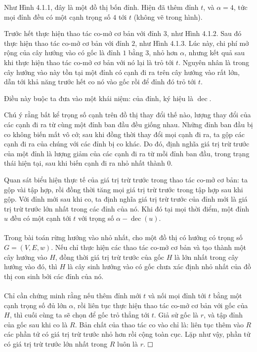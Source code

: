 \documentclass[11pt]{article}
\newcommand{\proofbox}{\ensuremath{\vcenter{\hrule height 0.45pt
  \hbox{\vrule width 0.45pt height 6pt\kern 6pt\vrule width 0.45pt}
  \hrule height 0.45pt}}}
\begin{document}
Như Hình 4.1.1, đây là một đồ thị bốn đỉnh. Hiện đã thêm đỉnh \(t\), và
\(\alpha=4\), tức mọi đỉnh đều có một cạnh trọng số \(4\) tới \(t\) (không vẽ
trong hình).

Trước hết thực hiện thao tác co-mở cơ bản với đỉnh \(3\), như Hình 4.1.2. Sau
đó thực hiện thao tác co-mở cơ bản với đỉnh \(2\), như Hình 4.1.3. Lúc này,
chi phí mở rộng của cây hướng vào có gốc là đỉnh \(1\) bằng \(3\), nhỏ hơn
\(\alpha\), nhưng kết quả sau khi thực hiện thao tác co-mở cơ bản với nó lại
là trỏ tới \(t\). Nguyên nhân là trong cây hướng vào này tồn tại một đỉnh có
cạnh đi ra trên cây hướng vào rất lớn, dẫn tới khả năng trước hết co nó vào gốc
rồi để đỉnh đó trỏ tới \(t\).

Điều này buộc ta đưa vào một khái niệm:  của đỉnh, ký
hiệu là \(\operatorname{dec}\).

Chú ý rằng bất kể trọng số cạnh trên đồ thị thay đổi thế nào, lượng thay đổi
của các cạnh đi ra từ cùng một đỉnh ban đầu đều giống nhau. Những đỉnh ban đầu
bị co không biến mất vô cớ; sau khi đồng thời thay đổi mọi cạnh đi ra, ta gộp
các cạnh đi ra của chúng với các đỉnh bị co khác. Do đó, định nghĩa giá trị trừ
trước của một đỉnh là lượng giảm của các cạnh đi ra từ mỗi đỉnh ban đầu, trong
trạng thái hiện tại, sau khi biến cạnh đi ra nhỏ nhất thành \(0\).

Quan sát biểu hiện thực tế của giá trị trừ trước trong thao tác co-mở cơ bản:
ta gộp vài tập hợp, rồi đồng thời tăng mọi giá trị trừ trước trong tập hợp sau
khi gộp. Với đỉnh mới sau khi co, ta định nghĩa giá trị trừ trước của đỉnh mới
là giá trị trừ trước lớn nhất trong các đỉnh của nó. Khi đó tại mọi thời điểm,
một đỉnh \(u\) đều có một cạnh tới \(t\) với trọng số
\(\alpha-\operatorname{dec}(u)\).

\paragraph{}
Trong bài toán rừng hướng vào nhỏ nhất, cho một đồ thị có hướng có trọng số
\(G=(V,E,w)\). Nếu chỉ thực hiện các thao tác co-mở cơ bản và tạo thành một cây
hướng vào \(H\), đồng thời giá trị trừ trước của gốc \(H\) là lớn nhất trong
cây hướng vào đó, thì \(H\) là cây sinh hướng vào có gốc chưa xác định nhỏ nhất
của đồ thị con sinh bởi các đỉnh của nó.

\paragraph{}
Chỉ cần chứng minh rằng nếu thêm đỉnh mới \(t\) và nối mọi đỉnh tới \(t\) bằng
một cạnh trọng số đủ lớn \(\alpha\), rồi liên tục thực hiện thao tác co-mở cơ
bản với gốc của \(H\), thì cuối cùng ta sẽ chọn để gốc trỏ thẳng tới \(t\). Giả
sử gốc là \(r\), và tập đỉnh của gốc sau khi co là \(R\). Bản chất của thao tác
co vào chỉ là: liên tục thêm vào \(R\) các phần tử có giá trị trừ trước nhỏ hơn
rồi cộng toàn cục. Lặp như vậy, phần tử có giá trị trừ trước lớn nhất trong
\(R\) luôn là \(r\). \proofbox
\end{document}

